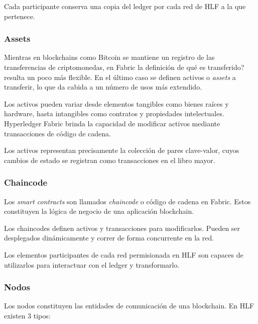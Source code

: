 Cada participante conserva una copia del ledger por cada red de HLF  a la que pertenece.

\subsubsection{Assets}
Mientras en blockchains como Bitcoin se mantiene un registro de las transferencias de criptomonedas, en Fabric la definici\'on de \textquestiondown qu\'e es transferido? resulta un poco m\'as flexible. En el \'ultimo caso se definen activos o \emph{assets} a transferir, lo que da cabida a un n\'umero de usos m\'as extendido.

Los activos pueden variar desde elementos tangibles como bienes ra\'ices y hardware, hasta intangibles como contratos y propiedades intelectuales. Hyperledger Fabric brinda la capacidad de modificar activos mediante transacciones de c\'odigo de cadena.

Los activos representan precisamente la colecci\'on de pares clave-valor, cuyos cambios de estado se registran como transacciones en el libro mayor.

\subsubsection{Chaincode}

Los \emph{smart contracts} son llamados \emph{chaincode} o c\'odigo de cadena en Fabric. Estos constituyen la l\'ogica de negocio de una aplicaci\'on blockchain. 

Los chaincodes definen activos y transacciones para modificarlos. Pueden ser desplegados din\'amicamente y correr de forma concurrente en la red.

Los elementos participantes de cada red permisionada en HLF son capaces de utilizarlos para interactuar con el ledger y transformarlo.

\subsubsection{Nodos}

Los nodos constituyen las entidades de comunicaci\'on de una blockchain. En HLF existen 3 tipos:

